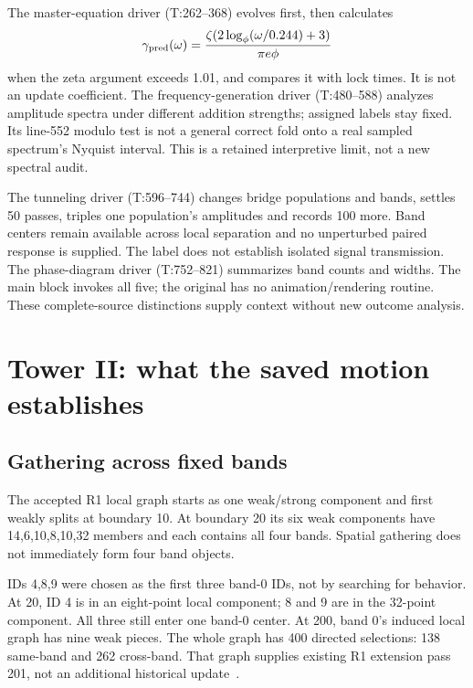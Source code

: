 \documentclass[11pt,a4paper]{article}
\newcommand{\src}[2]{\textsf{#1:#2}}
\begin{document}
The master-equation driver (\src{T}{262--368}) evolves first, then calculates
\[
\gamma_{\rm pred}(\omega)=
\frac{\zeta(2\log_\phi(\omega/0.244)+3)}{\pi e\phi}
\]
when the zeta argument exceeds 1.01, and compares it with lock times. It is not an update coefficient. The frequency-generation driver (\src{T}{480--588}) analyzes amplitude spectra under different addition strengths; assigned labels stay fixed. Its line-552 modulo test is not a general correct fold onto a real sampled spectrum's Nyquist interval. This is a retained interpretive limit, not a new spectral audit.

The tunneling driver (\src{T}{596--744}) changes bridge populations and bands, settles 50 passes, triples one population's amplitudes and records 100 more. Band centers remain available across local separation and no unperturbed paired response is supplied. The label does not establish isolated signal transmission. The phase-diagram driver (\src{T}{752--821}) summarizes band counts and widths. The main block invokes all five; the original has no animation/rendering routine. These complete-source distinctions supply context without new outcome analysis.

\section{Tower II: what the saved motion establishes}\label{sec:towerobs}
\subsection{Gathering across fixed bands}
The accepted R1 local graph starts as one weak/strong component and first weakly splits at boundary 10. At boundary 20 its six weak components have 14,6,10,8,10,32 members and each contains all four bands. Spatial gathering does not immediately form four band objects.

IDs 4,8,9 were chosen as the first three band-0 IDs, not by searching for behavior. At 20, ID 4 is in an eight-point local component; 8 and 9 are in the 32-point component. All three still enter one band-0 center. At 200, band 0's induced local graph has nine weak pieces. The whole graph has 400 directed selections: 138 same-band and 262 cross-band. That graph supplies existing R1 extension pass 201, not an additional historical update~\citep{s6study,s6review}.
\end{document}
